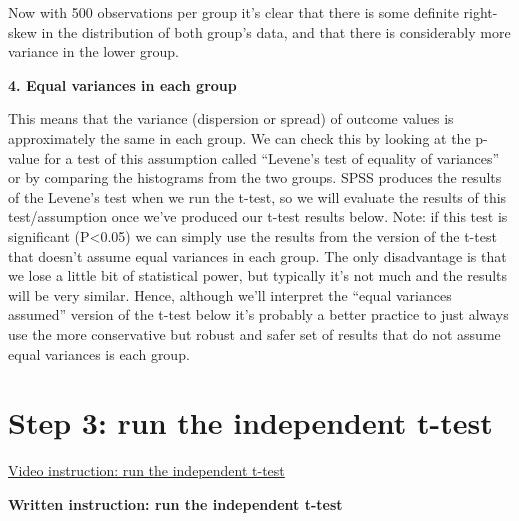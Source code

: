 \documentclass[
]{book}
\begin{document}
Now with 500 observations per group it's clear that there is some definite right-skew in the distribution of both group's data, and that there is considerably more variance in the lower group.

\textbf{4. Equal variances in each group}

This means that the variance (dispersion or spread) of outcome values is approximately the same in each group. We can check this by looking at the p-value for a test of this assumption called ``Levene's test of equality of variances'' or by comparing the histograms from the two groups. SPSS produces the results of the Levene's test when we run the t-test, so we will evaluate the results of this test/assumption once we've produced our t-test results below. Note: if this test is significant (P\textless0.05) we can simply use the results from the version of the t-test that doesn't assume equal variances in each group. The only disadvantage is that we lose a little bit of statistical power, but typically it's not much and the results will be very similar. Hence, although we'll interpret the ``equal variances assumed'' version of the t-test below it's probably a better practice to just always use the more conservative but robust and safer set of results that do not assume equal variances is each group.

\hypertarget{step-3-run-the-independent-t-test}{%
\section{Step 3: run the independent t-test}\label{step-3-run-the-independent-t-test}}

\href{https://youtu.be/jHGKbgDWuio}{Video instruction: run the independent t-test}

\textbf{Written instruction: run the independent t-test}
\end{document}
